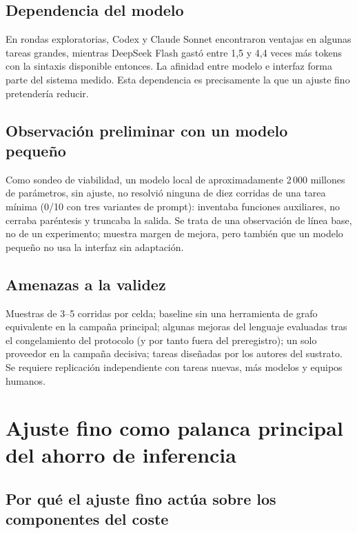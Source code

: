 \documentclass[11pt, a4paper]{article}
\begin{document}
\subsection{Dependencia del modelo}

En rondas exploratorias, Codex y Claude Sonnet encontraron ventajas en algunas tareas grandes, mientras DeepSeek Flash gastó entre 1,5 y 4,4 veces más tokens con la sintaxis disponible entonces. La afinidad entre modelo e interfaz forma parte del sistema medido. Esta dependencia es precisamente la que un ajuste fino pretendería reducir.

\subsection{Observación preliminar con un modelo pequeño}

Como sondeo de viabilidad, un modelo local de aproximadamente 2\,000 millones de parámetros, sin ajuste, no resolvió ninguna de diez corridas de una tarea mínima (0/10 con tres variantes de prompt): inventaba funciones auxiliares, no cerraba paréntesis y truncaba la salida. Se trata de una observación de línea base, no de un experimento; muestra margen de mejora, pero también que un modelo pequeño no usa la interfaz sin adaptación.

\subsection{Amenazas a la validez}

Muestras de 3--5 corridas por celda; baseline sin una herramienta de grafo equivalente en la campaña principal; algunas mejoras del lenguaje evaluadas tras el congelamiento del protocolo (y por tanto fuera del preregistro); un solo proveedor en la campaña decisiva; tareas diseñadas por los autores del sustrato. Se requiere replicación independiente con tareas nuevas, más modelos y equipos humanos.

\section{Ajuste fino como palanca principal del ahorro de inferencia}
\label{sec:finetune}

\subsection{Por qué el ajuste fino actúa sobre los componentes del coste}
\end{document}
